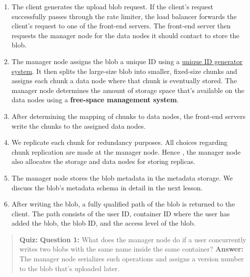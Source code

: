 \begin{enumerate}
\item
\protect{}\label{cy-n9pIVoWXlp1AMNZ2GI}
The client generates the upload blob request. If the client's request successfully passes through the rate limiter, the load balancer forwards the client's request to one of the front-end servers. The front-end server then requests the manager node for the data nodes it should contact to store the blob.
\item
\protect{}\label{YAsFa8OQXjaFUu4RkEp05}
The manager node assigns the blob a unique ID using a \href{https://www.educative.io/courses/grokking-the-system-design-interview/design-of-a-unique-id-generator}{unique ID generator system}. It then splits the large-size blob into smaller, fixed-size chunks and assigns each chunk a data node where that chunk is eventually stored. The manager node determines the amount of storage space that's available on the data nodes using a \textbf{free-space management system}.
\item
\protect{}\label{CxDdB8yQ_p3TqxzSn_pHr}
After determining the mapping of chunks to data nodes, the front-end servers write the chunks to the assigned data nodes.
\item
\protect{}\label{kt7zIvGsmremPbw8dmdkG}
We replicate each chunk for redundancy purposes. All choices regarding chunk replication are made at the manager node. Hence , the manager node also allocates the storage and data nodes for storing replicas.
\item
\protect{}\label{E2tmP9GGoFeCViYAfV9oi}
The manager node stores the blob metadata in the metadata storage. We discuss the blob's metadata schema in detail in the next lesson.
\item
\protect{}\label{Mrzz50_pLOeuOJ72xfqQG}
After writing the blob, a fully qualified path of the blob is returned to the client. The path consists of the user ID, container ID where the user has added the blob, the blob ID, and the access level of the blob.
\end{enumerate}

\begin{quote}
\textbf{Quiz:}
\textbf{Question 1:} What does the manager node do if a user concurrently writes two blobs with the same name inside the same container?
\textbf{Answer:} The manager node serializes such operations and assigns a version number to the blob that's uploaded later.
\end{quote}

